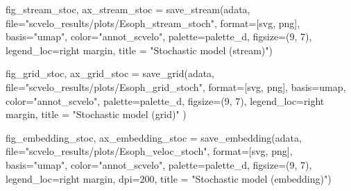 \documentclass[
  letterpaper,
  DIV=11,
  numbers=noendperiod]{scrreprt}
\newenvironment{Shaded}{\begin{snugshade}}{\end{snugshade}}
\newcommand{\BuiltInTok}[1]{\textcolor[rgb]{0.00,0.23,0.31}{#1}}
\newcommand{\DecValTok}[1]{\textcolor[rgb]{0.68,0.00,0.00}{#1}}
\newcommand{\NormalTok}[1]{\textcolor[rgb]{0.00,0.23,0.31}{#1}}
\newcommand{\OperatorTok}[1]{\textcolor[rgb]{0.37,0.37,0.37}{#1}}
\newcommand{\StringTok}[1]{\textcolor[rgb]{0.13,0.47,0.30}{#1}}
\begin{document}
\begin{Shaded}
\begin{Highlighting}[]
\NormalTok{fig\_stream\_stoc, ax\_stream\_stoc }\OperatorTok{=}\NormalTok{ save\_stream(adata, }\BuiltInTok{file}\OperatorTok{=}\StringTok{"scvelo\_results/plots/Esoph\_stream\_stoch"}\NormalTok{, }\BuiltInTok{format}\OperatorTok{=}\NormalTok{[}\StringTok{\textquotesingle{}svg\textquotesingle{}}\NormalTok{, }\StringTok{\textquotesingle{}png\textquotesingle{}}\NormalTok{], basis}\OperatorTok{=}\StringTok{"umap"}\NormalTok{, color}\OperatorTok{=}\StringTok{"annot\_scvelo"}\NormalTok{, palette}\OperatorTok{=}\NormalTok{palette\_d, figsize}\OperatorTok{=}\NormalTok{(}\DecValTok{9}\NormalTok{, }\DecValTok{7}\NormalTok{), legend\_loc}\OperatorTok{=}\StringTok{\textquotesingle{}right margin\textquotesingle{}}\NormalTok{, title }\OperatorTok{=} \StringTok{"Stochastic model (stream)"}\NormalTok{)}

\NormalTok{fig\_grid\_stoc, ax\_grid\_stoc }\OperatorTok{=}\NormalTok{ save\_grid(adata, }\BuiltInTok{file}\OperatorTok{=}\StringTok{"scvelo\_results/plots/Esoph\_grid\_stoch"}\NormalTok{, }\BuiltInTok{format}\OperatorTok{=}\NormalTok{[}\StringTok{\textquotesingle{}svg\textquotesingle{}}\NormalTok{, }\StringTok{\textquotesingle{}png\textquotesingle{}}\NormalTok{], basis}\OperatorTok{=}\StringTok{\textquotesingle{}umap\textquotesingle{}}\NormalTok{, color}\OperatorTok{=}\StringTok{"annot\_scvelo"}\NormalTok{, palette}\OperatorTok{=}\NormalTok{palette\_d, figsize}\OperatorTok{=}\NormalTok{(}\DecValTok{9}\NormalTok{, }\DecValTok{7}\NormalTok{), legend\_loc}\OperatorTok{=}\StringTok{\textquotesingle{}right margin\textquotesingle{}}\NormalTok{, title }\OperatorTok{=} \StringTok{"Stochastic model (grid)"}\NormalTok{ )}

\NormalTok{fig\_embedding\_stoc, ax\_embedding\_stoc }\OperatorTok{=}\NormalTok{ save\_embedding(adata, }\BuiltInTok{file}\OperatorTok{=}\StringTok{"scvelo\_results/plots/Esoph\_veloc\_stoch"}\NormalTok{, }\BuiltInTok{format}\OperatorTok{=}\NormalTok{[}\StringTok{\textquotesingle{}svg\textquotesingle{}}\NormalTok{, }\StringTok{\textquotesingle{}png\textquotesingle{}}\NormalTok{], basis}\OperatorTok{=}\StringTok{"umap"}\NormalTok{, color}\OperatorTok{=}\StringTok{"annot\_scvelo"}\NormalTok{, palette}\OperatorTok{=}\NormalTok{palette\_d, figsize}\OperatorTok{=}\NormalTok{(}\DecValTok{9}\NormalTok{, }\DecValTok{7}\NormalTok{), legend\_loc}\OperatorTok{=}\StringTok{\textquotesingle{}right margin\textquotesingle{}}\NormalTok{, dpi}\OperatorTok{=}\DecValTok{200}\NormalTok{, title }\OperatorTok{=} \StringTok{"Stochastic model (embedding)"}\NormalTok{)}
\end{Highlighting}
\end{Shaded}
\end{document}
